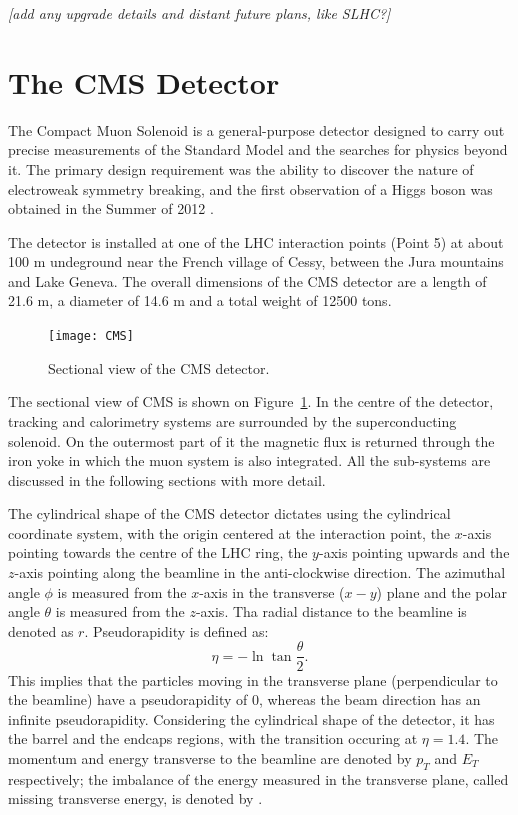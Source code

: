 \textit{[add any upgrade details and distant future plans, like SLHC?]}

\section{The CMS Detector}
The Compact Muon Solenoid \cite{CMS} is a general-purpose detector designed to carry out precise measurements of the
Standard Model and the searches for physics beyond it. The primary design requirement was the ability to
discover the nature of electroweak symmetry breaking, and the first observation of a Higgs boson was obtained in the
Summer of 2012 \cite{CMS_Higgs}.

The detector is installed at one of the LHC interaction points (Point 5) at about 100 m undeground near the French
village of Cessy, between the Jura mountains and Lake Geneva. The overall dimensions of the CMS detector are a length of
21.6 m, a diameter of 14.6 m and a total weight of 12500 tons.

\begin{figure}[htbp]
  \begin{center}
    \leavevmode
    \texttt{[image: CMS]}
    \caption{Sectional view of the CMS detector.}
    \label{CMS}
  \end{center}
\end{figure}

The sectional view of CMS is shown on Figure~\ref{CMS}. In the centre of the detector, tracking and calorimetry systems
are surrounded by the superconducting solenoid. On the outermost part of it the magnetic flux is returned through the
iron yoke in which the muon system is also integrated. All the sub-systems are discussed in the following sections with
more detail.

The cylindrical shape of the CMS detector dictates using the cylindrical coordinate system, with the origin centered at
the interaction point, the $x$-axis pointing towards the centre of the LHC ring, the $y$-axis pointing upwards and the
$z$-axis pointing along the beamline in the anti-clockwise direction. The azimuthal angle $\phi$ is measured from the
$x$-axis in the transverse ($x-y$) plane and the polar angle $\theta$ is measured from the $z$-axis. Tha radial distance
to the beamline is denoted as $r$. Pseudorapidity is defined as:
\begin{equation}
  \eta = - \ln{\tan{\frac{\theta}{2}}}.
\end{equation}
This implies that the particles moving in the transverse plane (perpendicular to the beamline) have a pseudorapidity of
0, whereas the beam direction has an infinite pseudorapidity. Considering the cylindrical shape of the detector, it has
the barrel and the endcaps regions, with the transition occuring at $\eta = 1.4$. The momentum and energy transverse to
the beamline are denoted by $p_T$ and $E_T$ respectively; the imbalance of the energy measured in the transverse plane,
called missing transverse energy, is denoted by \ETm.

